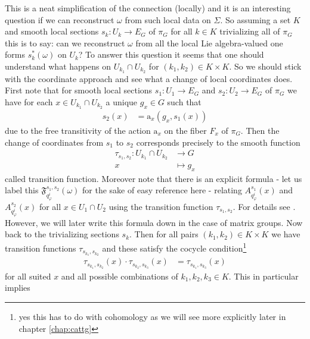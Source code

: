\begin{enumerate}
\begin{enumerate}
\end{enumerate}
This is a neat simplification of the connection (locally) and it is an interesting question if we can reconstruct $\omega$ from such local data on $\Sigma$. So assuming a set $K$ and smooth local sections $s_{k} \colon U_{k} \rightarrow E_{G}$ of $\pi_{G}$ for all $k \in K$ trivializing all of $\pi_{G}$ this is to say: can we reconstruct $\omega$ from all the local Lie algebra-valued one forms $s_{k}^{\ast}(\omega)$ on $U_{k}$? To answer this question it seems that one should understand what happens on $U_{k_{1}} \cap U_{k_{2}}$ for $(k_{1},k_{2}) \in K \times K$. So we should stick with the coordinate approach and see what a change of local coordinates does. First note that for smooth local sections $s_{1} \colon U_{1} \rightarrow E_{G}$ and $s_{2} \colon U_{2} \rightarrow E_{G}$ of $\pi_{G}$ we have for each $x \in U_{k_{1}} \cap U_{k_{2}}$ a unique $g_{x} \in G$ such that
\begin{align*}
  s_{2}(x)
  &=
  \mathrm{a}_{x}
  \left(
    g_{x},
    s_{1}(x)
  \right)
\end{align*}
due to the free transitivity of the action $\mathrm{a}_{x}$ on the fiber $F_{x}$ of $\pi_{G}$. Then the change of coordinates from $s_{1}$ to $s_{2}$ corresponds precisely to the smooth function
\begin{align*}
  \tau_{s_{1},s_{2}}
  \colon
  U_{k_{1}}
  \cap
  U_{k_{2}}
  &\rightarrow
  G
  \\
  x
  &\mapsto
  g_{x}
\end{align*}
called transition function. Moreover note that there is an explicit formula - let us label this $\mathfrak{F}_{q_{\varphi}^{i}}^{s_{1},s_{2}}(\omega)$ for the sake of easy reference here - relating $A_{q_{\varphi}^{i}}^{s_{1}}(x)$ and $A_{q_{\varphi}^{i}}^{s_{2}}(x)$ for all $x \in U_{1} \cap U_{2}$ using the transition function $\tau_{s_{1},s_{2}}$. For details see \cite{797789bc}. However, we will later write this formula down in the case of matrix groups. Now back to the trivializing sections $s_{k}$. Then for all pairs $(k_{1},k_{2}) \in K \times K$ we have transition functions $\tau_{s_{k_{1}},s_{k_{2}}}$ and these satisfy the cocycle condition\footnote{yes this has to do with cohomology as we will see more explicitly later in chapter \ref{chap:cattg}}
\begin{align*}
  \tau_{s_{k_{1}},s_{k_{2}}}(x)
  \cdot
  \tau_{s_{k_{2}},s_{k_{3}}}(x)
  &=
  \tau_{s_{k_{1}},s_{k_{3}}}(x)
\end{align*}
for all suited $x$ and all possible combinations of $k_{1},k_{2},k_{3} \in K$. This in particular implies

\end{enumerate}

